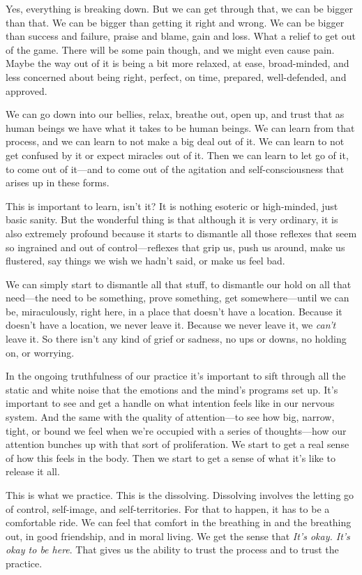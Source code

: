 Yes, everything is breaking down. But we can get through that, we can 
be bigger than that. We can be bigger than getting it right and wrong. 
We can be bigger than success and failure, praise and blame, gain and 
loss. What a relief to get out of the game. There will be some pain 
though, and we might even cause pain. Maybe the way out of it is being 
a bit more relaxed, at ease, broad-minded, and less concerned about 
being right, perfect, on time, prepared, well-defended, and approved.

We can go down into our bellies, relax, breathe out, open up, and trust 
that as human beings we have what it takes to be human beings. We can 
learn from that process, and we can learn to not make a big deal out of 
it. We can learn to not get confused by it or expect miracles out of 
it. Then we can learn to let go of it, to come out of it---and to come 
out of the agitation and self-consciousness that arises up in these 
forms.

This is important to learn, isn't it? It is nothing esoteric or 
high-minded, just basic sanity. But the wonderful thing is that 
although it is very ordinary, it is also extremely profound because it 
starts to dismantle all those reflexes that seem so ingrained and out 
of control---reflexes that grip us, push us around, make us flustered, 
say things we wish we hadn't said, or make us feel bad.

We can simply start to dismantle all that stuff, to dismantle our hold 
on all that need---the need to be something, prove something, get 
somewhere---until we can be, miraculously, right here, in a place that 
doesn't have a location. Because it doesn't have a location, we never 
leave it. Because we never leave it, we \emph{can't} leave it. So there 
isn't any kind of grief or sadness, no ups or downs, no holding on, or 
worrying.

In the ongoing truthfulness of our practice it's important to sift 
through all the static and white noise that the emotions and the mind's 
programs set up. It's important to see and get a handle on what 
intention feels like in our nervous system. And the same with the 
quality of attention---to see how big, narrow, tight, or bound we feel 
when we're occupied with a series of thoughts---how our attention 
bunches up with that sort of proliferation. We start to get a real 
sense of how this feels in the body. Then we start to get a sense of 
what it's like to release it all.

This is what we practice. This is the dissolving. Dissolving involves 
the letting go of control, self-image, and self-territories. For that 
to happen, it has to be a comfortable ride. We can feel that comfort in 
the breathing in and the breathing out, in good friendship, and in 
moral living. We get the sense that \emph{It's okay. It's okay to be 
here}. That gives us the ability to trust the process and to trust the 
practice.

